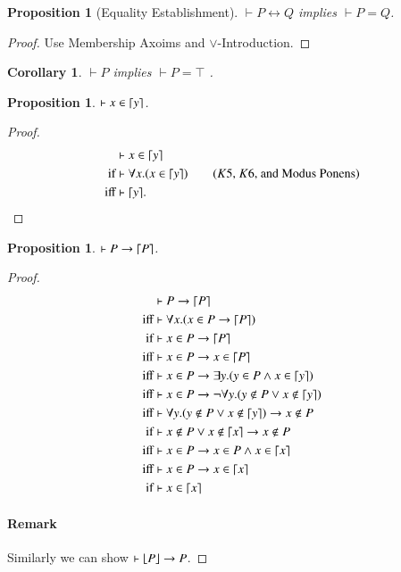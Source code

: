 \documentclass{article}
\theoremstyle{plain}
\newtheorem{prop}[thm]{Proposition}
\newtheorem{cor}[thm]{Corollary}
\DeclarePairedDelimiter\ceil{\lceil}{\rceil}
\DeclarePairedDelimiter\floor{\lfloor}{\rfloor}
\begin{document}
\begin{prop}[Equality Establishment]
\label{prop:eestablish}
$\vdash P \leftrightarrow Q$ implies $\vdash P = Q$.
\end{prop}
\begin{proof}
	Use Membership Axoims and $\vee$-Introduction.
\end{proof}
\begin{cor} \label{cor:top}
$\vdash P$ implies $\vdash P = \top$ .
\end{cor}

\begin{prop} \label{prop:var1}
$\vdash x \in \ceil*{y}$.
\end{prop}
\begin{proof}
\begin{align*}
&\vdash x \in \ceil*{y} \\
{\text{if}}& \vdash \forall x . (x \in \ceil*{y}) \tag{$K5$, $K6$, and Modus Ponens} \\
{\text{iff}}& \vdash \ceil*{y}.
\end{align*}
\end{proof}

\begin{prop} \label{prop:p->ceilp}
$\vdash P \to \ceil*{P}$.
\end{prop}
\begin{proof}
\begin{align*} 
&\vdash P \to \ceil*{P} \\
{\text{iff}}& \vdash \forall x . (x \in P \to \ceil*{P}) \\
{\text{if}}&  \vdash x \in P \to \ceil*{P} \\
{\text{iff}}& \vdash x \in P \to x \in \ceil*{P} \\
{\text{iff}}& \vdash x \in P \to \exists y . (y \in P \wedge x \in \ceil*{y}) \\
{\text{iff}}& \vdash x \in P \to \neg \forall y . (y \not \in P \vee x \not \in \ceil*{y}) \\
{\text{iff}}& \vdash \forall y . (y \not \in P \vee x \not \in \ceil*{y}) \to x \not \in P \\
{\text{if}}&  \vdash x \not \in P \vee x \not \in \ceil*{x} \to x \not \in P \\
{\text{iff}}& \vdash x \in P \to x \in P \wedge x \in \ceil*{x} \\
{\text{iff}}& \vdash x \in P \to x \in \ceil*{x} \\
{\text{if}}&  \vdash x \in \ceil*{x} \\
\end{align*}
\paragraph{Remark} Similarly we can show $\vdash \floor*{P} \to P$.
\end{proof}
\end{document}
